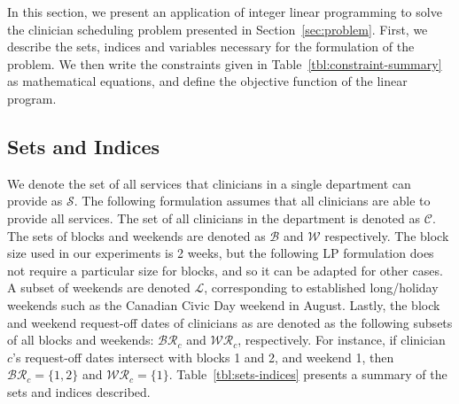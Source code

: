 In this section, we present an application of integer linear programming to solve the clinician
scheduling problem presented in Section~\ref{sec:problem}. First, we describe
the sets, indices and variables necessary for the formulation of the problem. We
then write the constraints given in Table~\ref{tbl:constraint-summary} as
mathematical equations, and define the objective function of the linear program.

\subsection{Sets and Indices}\label{sec:meth-sets-indices}
We denote the set of all services %
that clinicians in a single department can provide as $\mathcal{S}$. The
following formulation assumes that all clinicians are able to provide all
services. The set of all clinicians in the department is denoted as
$\mathcal{C}$. The sets of blocks and weekends
are denoted as $\mathcal{B}$ and $\mathcal{W}$ respectively. The block size
used in our experiments is 2 weeks, but the following LP formulation does not
require a particular size for blocks, and so it can be adapted for other cases.
A subset of weekends are denoted $\mathcal{L}$, corresponding to established
long/holiday weekends such as the Canadian Civic Day weekend in August. Lastly,
the block and weekend request-off dates of clinicians as are denoted as the following
subsets of all blocks and weekends: $\mathcal{BR}_c$ and $\mathcal{WR}_c$, respectively.
For instance, if clinician $c$'s request-off dates intersect with blocks 1 and 2, and weekend
1, then $\mathcal{BR}_c = \{1, 2\}$ and $\mathcal{WR}_c = \{1\}$. Table~\ref{tbl:sets-indices} presents a summary of the sets and indices described. 


